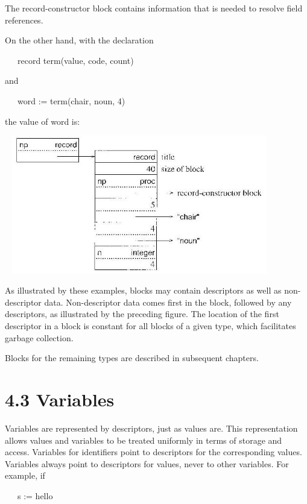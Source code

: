 The record-constructor block contains information that is needed to
resolve field references.

On the other hand, with the declaration

{\ttfamily\mdseries
\ \ \ record term(value, code, count)}

and

{\ttfamily\mdseries
\ \ \ word := term({\textquotedbl}chair{\textquotedbl}, {\textquotedbl}noun{\textquotedbl}, 4)}

the value of word is:

\begin{center}
\includegraphics[width=4.6398in,height=2.3799in]{ib-img/ib-img012.jpg}
\end{center}

As illustrated by these examples, blocks may contain descriptors as
well as non-descriptor data. Non-descriptor data comes first in the
block, followed by any descriptors, as illustrated by the preceding
figure. The location of the first descriptor in a block is constant
for all blocks of a given type, which facilitates garbage collection.

Blocks for the remaining types are described in subsequent chapters.

\section[4.3 Variables]{4.3 Variables}

Variables are represented by descriptors, just as values are. This
representation allows values and variables to be treated uniformly in
terms of storage and access. Variables for identifiers point to
descriptors for the corresponding values. Variables always point to
descriptors for values, never to other variables. For example, if

{\ttfamily\mdseries
\ \ \ s := {\textquotedbl}hello{\textquotedbl}}

